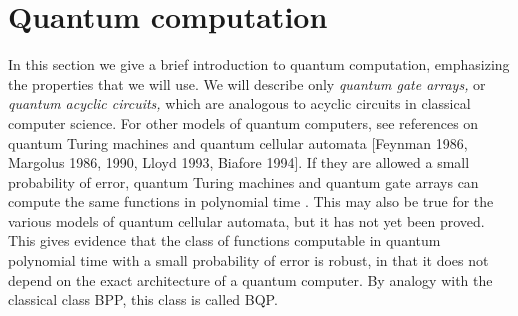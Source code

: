 \section{Quantum computation}
In this section we give a brief introduction to quantum computation,
emphasizing the properties that we will use.  
We will describe only {\em quantum gate arrays,} or {\em quantum
acyclic circuits,} which are analogous to acyclic circuits in
classical computer science.  For other models 
of quantum computers, see references
on quantum Turing machines \cite{Deut89,BeVa,Yao} and quantum cellular 
automata [Feynman 1986, Margolus 1986, 1990, Lloyd 1993, Biafore 1994].
If they are allowed a small probability of 
error, quantum Turing machines and quantum gate arrays can compute the same 
functions in polynomial time \cite{Yao}.  This may also be true for the
various models
of quantum cellular automata, but it has not yet been proved.
This gives evidence that the class of functions computable in quantum
polynomial time with a small probability of error is robust, in that it
does not depend on the exact architecture of a quantum computer.  By analogy
with the classical class BPP, this class is called BQP.

